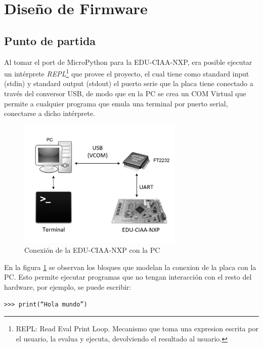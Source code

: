 \section{Diseño de Firmware}

\subsection{Punto de partida} 

Al tomar el port de MicroPython para la EDU-CIAA-NXP, era posible ejecutar un intérprete \textit{REPL}\footnote{REPL: Read Eval Print Loop. Mecanismo que toma una expresion escrita por el usuario, la evalua y ejecuta, devolviendo el resultado al usuario.} que provee el proyecto, el cual tiene como standard input (stdin) y standard output (stdout) el puerto serie que la placa tiene conectado a través del conversor USB, de modo que en la PC se crea un COM Virtual que permite a cualquier programa que emula una terminal por puerto serial, conectarse a dicho intérprete.

\begin{figure}[h]
  \centering
    \includegraphics[width=0.7\textwidth]{Figures/fig_conexion}
  \caption{Conexión de la EDU-CIAA-NXP con la PC}
  \label{fig:conexion}
\end{figure}

En la figura \ref{fig:conexion} se observan los bloques que modelan la conexion de la placa con la PC.
Esto permite ejecutar programas que no tengan interacción con el resto del hardware, por ejemplo, se puede escribir:

\begin{verbatim}
>>> print(“Hola mundo”)
\end{verbatim}

